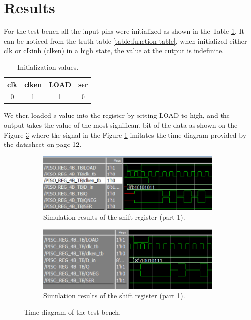 \documentclass[9pt,technote]{IEEEtran}
\begin{document}
	\section{Results}
		
	For the test bench all the input pins were initialized as shown in the Table \ref{table:Init table}. It can be noticed from the truth table \ref{table:function-table}, when initialized either clk or clkinh (clken) in a high state, the value at the output is indefinite.
	
	\begin{table}
		\centering
		\begin{tabular}{|c|c|c|c|}
			\hline
			clk & clken & LOAD & ser \\
			\hline
			0 & 1 & 1 & 0 \\
			\hline
		\end{tabular}
		\caption{Initialization values.}
		\label{table:Init table}
	\end{table}
	
	We then loaded a value into the register by setting LOAD to high, and the output takes the value of the most significant bit of the data as shown on the Figure \ref{fig:timediagram} where the signal in the Figure \ref{fig:timediagram:1b} imitates the time diagram provided by the datasheet on page 12.
	
	\begin{figure}[H]
		\begin{subfigure}[b]{\columnwidth}
			\centering
			\includegraphics[width=0.9\columnwidth]{time_diagram1}
			\caption{Simulation results of the shift register (part 1).}
			\label{fig:timediagram:1b}
		\end{subfigure}
		\vspace{0.5cm}
		\begin{subfigure}[b]{\columnwidth}
			\centering
			\includegraphics[width=0.9\columnwidth]{time_diagram2}
			\caption{Simulation results of the shift register (part 1).}
			\label{fig:timediagram:2b}
		\end{subfigure}
		\caption{Time diagram of the test bench.}
		\label{fig:timediagram}
	\end{figure}
	
\end{document}
